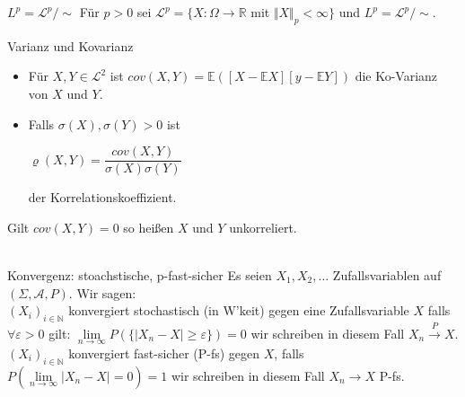 \documentclass[avery5371,grid,frame]{flashcards} %
\newcommand{\1}{ \mathbb{1} } %
\begin{document}
\begin{flashcard}[Definition]{$L^p=\mathcal{L}^p/\sim$}
  Für $p>0$ sei $\mathcal{L}^p=\{X:\Omega \to \mathbb{R}$ mit $\Vert X\Vert_p<\infty\}$ und $L^p=\mathcal{L}^p/\sim$.
\end{flashcard}

\begin{flashcard}[Definition]{Varianz und Kovarianz}
  \begin{itemize}
  \item Für $X,Y \in \mathcal{L}^2$ ist
    $cov(X,Y)=\mathbb{E}([X-\mathbb{E}X][y-\mathbb{E}Y])$ die
    Ko-Varianz von $X$ und $Y$.
  \item Falls $\sigma(X), \sigma(Y)>0$ ist
    \begin{center}
      $\varrho(X,Y)=\dfrac{cov(X,Y)}{\sigma(X)\sigma(Y)}$
    \end{center}
    der Korrelationskoeffizient.
  \end{itemize}
  Gilt $cov(X,Y)=0$ so heißen $X$ und $Y$ unkorreliert.\\\\
\end{flashcard}

\begin{flashcard}[Definition]{Konvergenz: stoachstische, p-fast-sicher}
  Es seien $X_1,X_2,\ldots$ Zufallsvariablen auf $(\Sigma,\mathcal{A},P)$. Wir sagen:\\
 $(X_i)_{i \in \mathbb{N}}$ konvergiert stochastisch (in W'keit) gegen eine Zufallsvariable $X$ falls $\forall\varepsilon >0$ gilt:
      $\lim\limits_{n \to \infty}P(\{|X_n-X|\geq \varepsilon\})=0$
    wir schreiben in diesem Fall $X_n \overset{P}{\to} X$.\\
   $(X_i)_{i \in \mathbb{N}}$ konvergiert fast-sicher (P-fs)  gegen $X$, falls
      $P\left(\lim\limits_{n \to \infty}|X_n-X|=0\right)=1$
    wir schreiben in diesem Fall $X_n \to X$ P-fs.
\end{flashcard}
\end{document}
